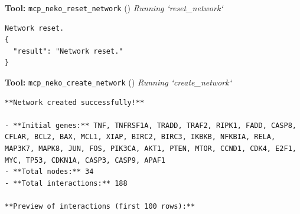 \documentclass[11pt,a4paper]{article}
\begin{document}
\begin{toolokbox}
\textbf{Tool:} \texttt{mcp\_neko\_reset\_network} (\checkmark)
\textit{Running `reset\_network`}
\begin{lstlisting}
Network reset.
{
  "result": "Network reset."
}
\end{lstlisting}
\end{toolokbox}
\begin{toolokbox}
\textbf{Tool:} \texttt{mcp\_neko\_create\_network} (\checkmark)
\textit{Running `create\_network`}
\begin{lstlisting}
**Network created successfully!**

- **Initial genes:** TNF, TNFRSF1A, TRADD, TRAF2, RIPK1, FADD, CASP8, CFLAR, BCL2, BAX, MCL1, XIAP, BIRC2, BIRC3, IKBKB, NFKBIA, RELA, MAP3K7, MAPK8, JUN, FOS, PIK3CA, AKT1, PTEN, MTOR, CCND1, CDK4, E2F1, MYC, TP53, CDKN1A, CASP3, CASP9, APAF1
- **Total nodes:** 34
- **Total interactions:** 188

**Preview of interactions (first 100 rows):**


\end{lstlisting}
\end{toolokbox}
\end{document}
